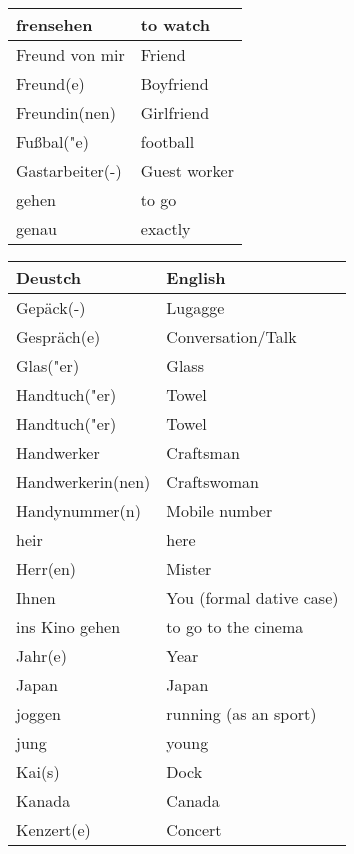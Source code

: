 \documentclass{article}
\renewcommand{\arraystretch}{1}
\begin{document}
\begin{minipage}{0.48\textwidth}
\begin{tabular}{|>{\raggedright\arraybackslash}p{3.5cm}|>{\raggedright\arraybackslash}p{3.5cm}|}
        frensehen & to watch  \\\hline
        Freund von mir & Friend \\\hline
        Freund(e) & Boyfriend \\\hline
        Freundin(nen) & Girlfriend \\\hline
        Fu\ss{}bal("e) & football \\\hline
        Gastarbeiter(-) & Guest worker \\\hline
        gehen & to go \\\hline
        genau & exactly \\\hline
    \end{tabular}
\end{minipage}%
\hfill
\begin{minipage}{0.48\textwidth}
    \centering
    \renewcommand{\arraystretch}{1.5}
    \begin{tabular}{|>{\raggedright\arraybackslash}p{3.5cm}|>{\raggedright\arraybackslash}p{3.5cm}|}
        \hline
        \rowcolor{gray!20} \textbf{Deustch} & \textbf{English} \\
        \hline
        Gepäck(-) & Lugagge \\\hline
        Gespräch(e) & Conversation/Talk \\\hline
        Glas("er) & Glass \\\hline
        Handtuch("er) & Towel \\\hline
        Handtuch("er) & Towel \\\hline
        Handwerker & Craftsman \\\hline
        Handwerkerin(nen) & Craftswoman \\\hline
        Handynummer(n) & Mobile number \\\hline
        heir & here \\\hline
        Herr(en) & Mister \\\hline
        Ihnen & You (formal dative case) \\\hline
        ins Kino gehen & to go to the cinema \\\hline
        Jahr(e) & Year \\\hline
        Japan & Japan \\\hline
        joggen & running (as an sport) \\\hline
        jung & young \\\hline
        Kai(s) & Dock \\\hline
        Kanada & Canada \\\hline
        Kenzert(e) & Concert \\\hline

\end{tabular}
\end{minipage}
\end{document}
